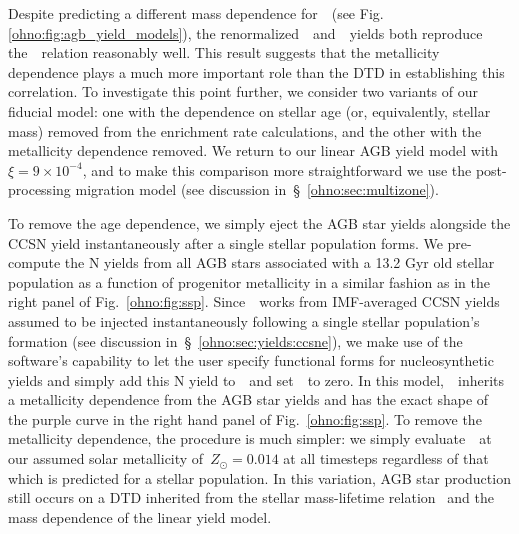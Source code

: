 Despite predicting a different mass dependence for~~(see Fig.
\ref{ohno:fig:agb_yield_models}), the renormalized~\cristallo~and~\ventura~yields
both reproduce the~\ohno~relation reasonably well.
This result suggests that the metallicity dependence plays a much more
important role than the DTD in establishing this correlation.
To investigate this point further, we consider two variants of our fiducial
model: one with the dependence on stellar age (or, equivalently, stellar mass)
removed from the enrichment rate calculations, and the other with the
metallicity dependence removed.
We return to our linear AGB yield model with~$\xi = 9\times10^{-4}$, and
to make this comparison more straightforward we use the post-processing
migration model (see discussion in~\S~\ref{ohno:sec:multizone}).
\par
To remove the age dependence, we simply eject the AGB star yields alongside
the CCSN yield instantaneously after a single stellar population forms.
We pre-compute the N yields from all AGB stars associated with a 13.2 Gyr old
stellar population as a function of progenitor metallicity in a similar fashion
as in the right panel of Fig.~\ref{ohno:fig:ssp}.
Since~\vice~works from IMF-averaged CCSN yields assumed to be injected
instantaneously following a single stellar population's formation (see
discussion in~\S~\ref{ohno:sec:yields:ccsne}), we make use of the software's
capability to let the user specify functional forms for nucleosynthetic yields
and simply add this N yield to~~and set~~to zero.
In this model,~~inherits a metallicity dependence from the AGB star
yields and has the exact shape of the purple curve in the right hand panel of
Fig.~\ref{ohno:fig:ssp}.
To remove the metallicity dependence, the procedure is much simpler: we simply
evaluate~~at our assumed solar metallicity of~$Z_\odot = 0.014$ at all
timesteps regardless of that which is predicted for a stellar population.
In this variation, AGB star production still occurs on a DTD inherited from
the stellar mass-lifetime relation~\citep{Larson1974} and the mass dependence
of the linear yield model.
